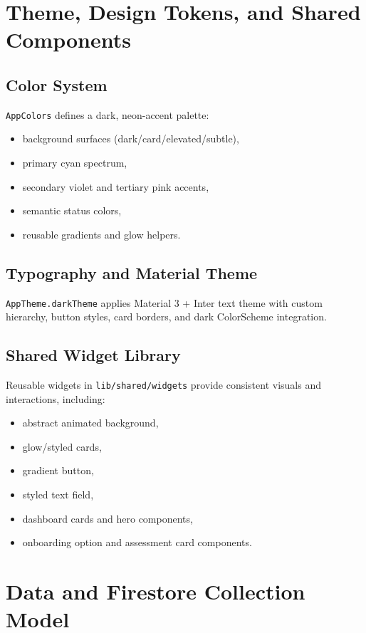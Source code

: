 \documentclass[11pt,a4paper]{article}
\begin{document}
\section{Theme, Design Tokens, and Shared Components}
\subsection{Color System}
\texttt{AppColors} defines a dark, neon-accent palette:
\begin{itemize}
  \item background surfaces (dark/card/elevated/subtle),
  \item primary cyan spectrum,
  \item secondary violet and tertiary pink accents,
  \item semantic status colors,
  \item reusable gradients and glow helpers.
\end{itemize}

\subsection{Typography and Material Theme}
\texttt{AppTheme.darkTheme} applies Material 3 + Inter text theme with custom hierarchy, button styles, card borders, and dark ColorScheme integration.

\subsection{Shared Widget Library}
Reusable widgets in \texttt{lib/shared/widgets} provide consistent visuals and interactions, including:
\begin{itemize}
  \item abstract animated background,
  \item glow/styled cards,
  \item gradient button,
  \item styled text field,
  \item dashboard cards and hero components,
  \item onboarding option and assessment card components.
\end{itemize}

\section{Data and Firestore Collection Model}
\end{document}
